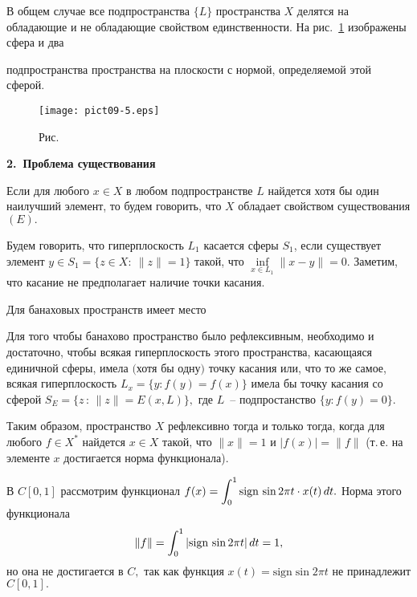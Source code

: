 В общем случае все подпространства $\{L\}$ пространства $X$
 делятся на обладающие и  не обладающие свойством единственности.
 {На {рис.~\ref{r9-5}} изображены сфера и два}
 {подпространства пространства на плоскости с нормой,
 определяемой этой сферой.

 \begin{figure}[ht]
\begin{center}
\texttt{[image: pict09-5.eps]}
\end{center}
 \bigskip
 \label{r9-5}

 \centerline{Рис.~\theris}
 \bigskip
\end{figure}


 \vspace{3mm}
 {\bf 2.~Проблема существования}
  \vspace{3mm}

 Если для  любого $x\in X$ в любом подпространстве $L$
 найдется  хотя бы один наилучший элемент, то будем говорить, что $X$
 обладает свойством существования $(E).$

Будем говорить, что гиперплоскость {$L_1$} касается сферы
$S_1$, если существует элемент $y\in S_1=\{ z\in X:\ \|z\|=1\}$
такой, что $\inf\limits_{x\in {L_1}} \|x-y\|=0.$ Заметим, что касание не предполагает наличие точки касания.

Для банаховых пространств {имеет место}
 \begin{teo}[Джеймс] %
 Для того чтобы банахово пространство было рефлексивным, необходимо и
 достаточно, чтобы всякая гиперплоскость этого пространства,
 касающаяся единичной сферы, имела $($хотя бы одну$)$ точку касания
 {или, что то же самое, всякая гиперплоскость $L_x=\{y : f(y)=f(x)\}$ имела бы точку}
 {касания со сферой $S_E=\{z\,:\,\|z\|=E(x,L)\},$ где $L$~-- подпростанство $\{y:f(y)=0\}.$}
 \end{teo}

 Таким образом, пространство $X$
  рефлексивно тогда и только тогда, когда для любого $f\in X^*$
 найдется $x\in X$ такой, что $\|x\|=1$ и $|f(x)|=\|f\|$
 (т.\,е. на элементе $x$ достигается норма функционала).

 \begin{Example} %
 В $C[0,1]$ рассмотрим функционал $f(x)=\displaystyle\int_0^1 {\rm sign \, }\sin 2\pi t\cdot
 x(t)\,dt.$ Норма этого функционала
 $$
 \|f\|=\int_0^1 |{\rm sign \, }\sin 2\pi t|\, dt=1,
 $$
 но она не достигается в $C,$ так как функция $x(t)=\mbox{sign} \sin
 2\pi t$ не принадлежит $C[0,1].$



\end{Example}}
